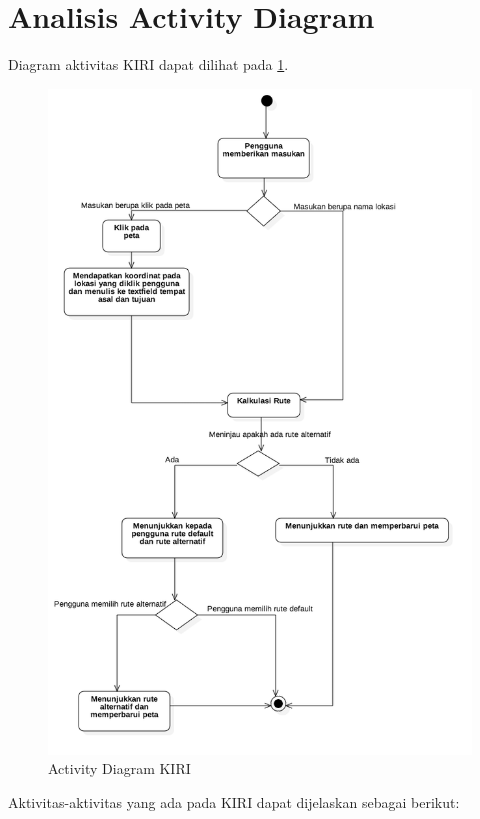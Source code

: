 \section{Analisis Activity Diagram}
\label{sec:activitydiagram}
Diagram aktivitas KIRI dapat dilihat pada \ref{fig:3_activitydiagram}.

\begin{figure}[H]
	\centering
	\includegraphics[scale=0.5]{Gambar/activitydiagram}
	\caption{Activity Diagram KIRI} 
	\label{fig:3_activitydiagram}
\end{figure}

Aktivitas-aktivitas yang ada pada KIRI dapat dijelaskan sebagai berikut:

